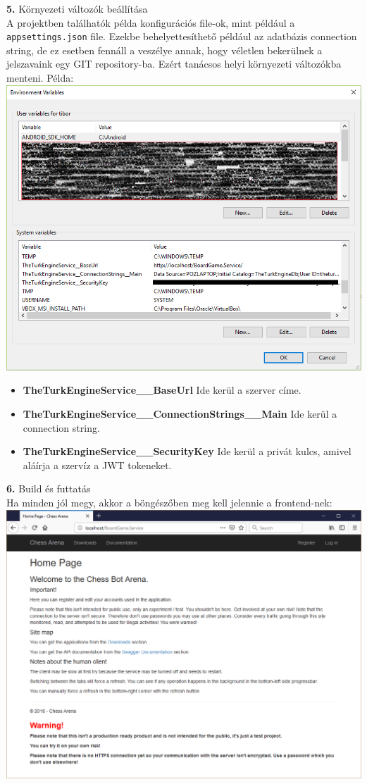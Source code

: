\documentclass[twoside, a4paper, 12pt]{book}
\begin{document}
\noindent \textbf{5.} Környezeti változók beállítása \\
A projektben találhatók példa konfigurációs file-ok, mint például a \texttt{appsettings.json} file. Ezekbe behelyettesíthető például az adatbázis connection string, de ez esetben fennáll a veszélye annak, hogy véletlen bekerülnek a jelszavaink egy GIT repository-ba. Ezért tanácsos helyi környezeti változókba menteni. Példa:
\includegraphics[width=1.0\textwidth]{img/server_dev_run_4.png}
\begin{itemize}
	\item \textbf{TheTurkEngineService\_\_BaseUrl} Ide kerül a szerver címe.
	\item \textbf{TheTurkEngineService\_\_ConnectionStrings\_\_Main} Ide kerül a connection string.
	\item \textbf{TheTurkEngineService\_\_SecurityKey} Ide kerül a privát kulcs, amivel aláírja a szervíz a JWT tokeneket.
\end{itemize}

\noindent \textbf{6.} Build és futtatás \\
Ha minden jól megy, akkor a böngészőben meg kell jelennie a frontend-nek: \\
\includegraphics[width=1.0\textwidth]{img/server_dev_run_5.png} \\
\end{document}
